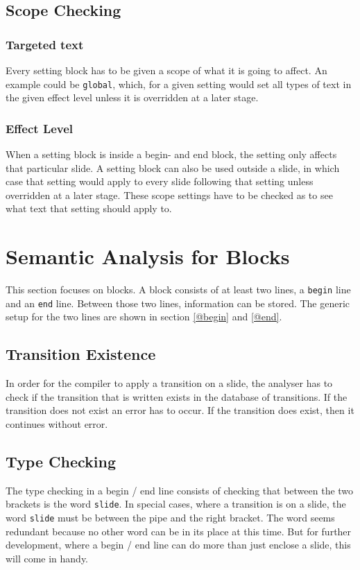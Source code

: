 \subsection{Scope Checking}

\subsubsection*{Targeted text}
Every setting block has to be given a scope of what it is going to affect. An example could be \texttt{global}, which, for a given setting would set all types of text in the given effect level unless it is overridden at a later stage.
\subsubsection*{Effect Level}
When a setting block is inside a begin- and end block, the setting only affects that particular slide.
A setting block can also be used outside a slide, in which case that setting would apply to every slide following that setting unless overridden at a later stage. These scope settings have to be checked as to see what text that setting should apply to.

\section{Semantic Analysis for Blocks}
This section focuses on blocks. A block consists of at least two lines, a \texttt{begin} line and an \texttt{end} line.
Between those two lines, information can be stored.
The generic setup for the two lines are shown in section \ref{@begin} and \ref{@end}.

    \subsection{Transition Existence}
In order for the compiler to apply a transition on a slide, the analyser has to check if the transition that is written exists in the database of transitions. If the transition does not exist an error has to occur. If the transition does exist, then it continues without error.

    \subsection{Type Checking}
The type checking in a begin / end line consists of checking that between the two brackets is the word \texttt{slide}. In special cases, where a transition is on a slide, the word \texttt{slide} must be between the pipe and the right bracket. The word seems redundant because no other word can be in its place at this time. But for further development, where a begin / end line can do more than just enclose a slide, this will come in handy.


